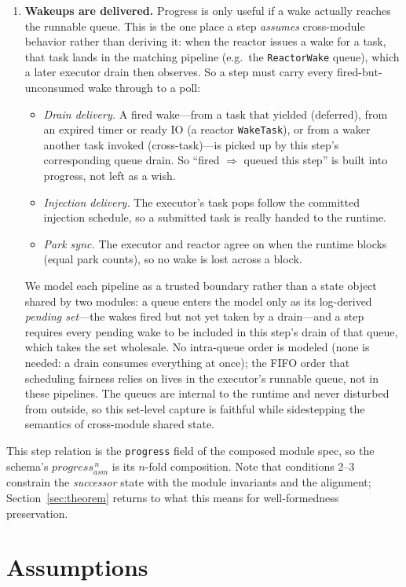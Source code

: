 \documentclass[11pt]{article}
\theoremstyle{plain}
\theoremstyle{definition}
\begin{document}
\begin{enumerate}
\item \textbf{Wakeups are delivered.} Progress is only useful if a wake actually reaches
the runnable queue. This is the one place a step \emph{assumes} cross-module behavior
rather than deriving it: when the reactor issues a wake for a task, that task lands in the
matching pipeline (e.g.\ the \texttt{ReactorWake} queue), which a later executor drain then
observes. So a step must carry every fired-but-unconsumed wake through to a poll:
  \begin{itemize}
  \item \emph{Drain delivery.} A fired wake---from a task that yielded (deferred), from an
    expired timer or ready IO (a reactor \texttt{WakeTask}), or from a waker another task
    invoked (cross-task)---is picked up by this step's corresponding queue drain. So
    ``fired $\Rightarrow$ queued this step'' is built into progress, not left as a wish.
  \item \emph{Injection delivery.} The executor's task pops follow the committed injection
    schedule, so a submitted task is really handed to the runtime.
  \item \emph{Park sync.} The executor and reactor agree on when the runtime blocks (equal
    park counts), so no wake is lost across a block.
  \end{itemize}
We model each pipeline as a trusted boundary rather than a state object shared by two
modules: a queue enters the model only as its log-derived \emph{pending set}---the wakes
fired but not yet taken by a drain---and a step requires every pending wake to be included
in this step's drain of that queue, which takes the set wholesale. No intra-queue order is
modeled (none is needed: a drain consumes everything at once); the FIFO order that
scheduling fairness relies on lives in the executor's runnable queue, not in these
pipelines. The queues are internal to the runtime and never disturbed from outside, so
this set-level capture is faithful while sidestepping the semantics of cross-module shared
state.
\end{enumerate}

\noindent
This step relation is the \lstinline|progress| field of the composed module spec, so the
schema's $\mathit{progress}^{\,n}_{\mathit{asm}}$ is its $n$-fold composition. Note that
conditions 2--3 constrain the \emph{successor} state with the module invariants and the
alignment; Section~\ref{sec:theorem} returns to what this means for well-formedness
preservation.

\section{Assumptions}
\label{sec:assumptions}
\end{document}
